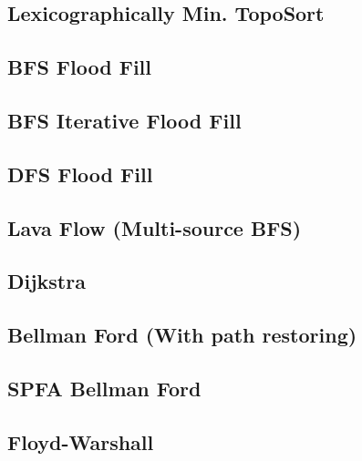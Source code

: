 \documentclass[10pt]{article}
\begin{document}
\begin{multicols*}{2}
\subsection{Lexicographically Min. TopoSort}


\subsection{BFS Flood Fill}


\subsection{BFS Iterative Flood Fill}


\subsection{DFS Flood Fill}


\subsection{Lava Flow (Multi-source BFS)}


\subsection{Dijkstra}


\subsection{Bellman Ford (With path restoring)}


\subsection{SPFA Bellman Ford}



\subsection{Floyd-Warshall}



\end{multicols*}
\end{document}
